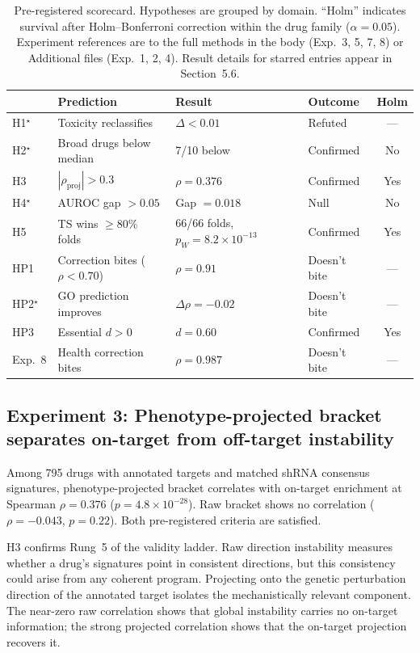 \documentclass[10pt]{article}
\begin{document}
\begin{table}[t]
\centering
\caption{Pre-registered scorecard. Hypotheses are grouped by domain.
``Holm'' indicates survival after Holm--Bonferroni correction within
the drug family ($\alpha = 0.05$). Experiment references are to the
full methods in the body (Exp.~3, 5, 7, 8) or Additional files
(Exp.~1, 2, 4). Result details for starred entries appear in Section~5.6.}
\label{tab:scorecard}
\small
\begin{tabular}{llllc}
\toprule
 & Prediction & Result & Outcome & Holm \\
\midrule
H1$^\star$ & Toxicity reclassifies & $\Delta < 0.01$ & Refuted & --- \\
H2$^\star$ & Broad drugs below median & 7/10 below & Confirmed & No \\
H3 & $|\rho_{\text{proj}}| > 0.3$ & $\rho = 0.376$ & Confirmed & Yes \\
H4$^\star$ & AUROC gap $> 0.05$ & Gap $= 0.018$ & Null & No \\
H5 & TS wins $\geq$80\% folds & 66/66 folds, $p_W = 8.2 \times 10^{-13}$ & Confirmed & Yes \\
\midrule
HP1 & Correction bites ($\rho < 0.70$) & $\rho = 0.91$ & Doesn't bite & --- \\
HP2$^\star$ & GO prediction improves & $\Delta\rho = -0.02$ & Doesn't bite & --- \\
HP3 & Essential $d > 0$ & $d = 0.60$ & Confirmed & Yes \\
\midrule
Exp.~8 & Health correction bites & $\rho = 0.987$ & Doesn't bite & --- \\
\bottomrule
\end{tabular}
\end{table}

\subsection{Experiment 3: Phenotype-projected bracket separates on-target from off-target instability}

Among 795 drugs with annotated targets and matched shRNA consensus signatures,
phenotype-projected bracket correlates with on-target enrichment at Spearman
$\rho = 0.376$ ($p = 4.8 \times 10^{-28}$). Raw bracket shows no correlation
($\rho = -0.043$, $p = 0.22$). Both pre-registered criteria are satisfied.

H3 confirms Rung~5 of the validity ladder. Raw direction instability
measures whether a drug's signatures point in consistent directions, but
this consistency could arise from any coherent program. Projecting onto the
genetic perturbation direction of the annotated target isolates the
mechanistically relevant component. The near-zero raw correlation shows
that global instability carries no on-target information; the strong
projected correlation shows that the on-target projection recovers it.
\end{document}
